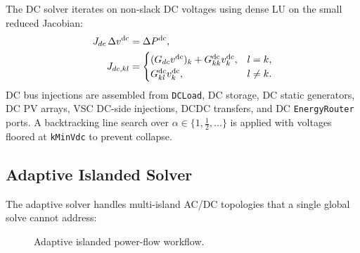 The DC solver iterates on non-slack DC voltages using dense LU on the small
reduced Jacobian:
\begin{align}
J_{dc}\,\Delta v^{\mathrm{dc}} &= \Delta P^{\mathrm{dc}}, \\
J_{dc,kl} &=
\begin{cases}
(G_{dc}v^{\mathrm{dc}})_k + G_{kk}^{\mathrm{dc}}v_k^{\mathrm{dc}}, & l=k, \\
G_{kl}^{\mathrm{dc}}v_k^{\mathrm{dc}}, & l\neq k.
\end{cases}
\end{align}
DC bus injections are assembled from \texttt{DCLoad}, DC storage, DC static
generators, DC PV arrays, VSC DC-side injections, DCDC transfers, and DC
\texttt{EnergyRouter} ports.
A backtracking line search over \(\alpha\in\{1,\tfrac12,\ldots\}\) is applied
with voltages floored at \texttt{kMinVdc} to prevent collapse.

\subsection{Adaptive Islanded Solver}

The adaptive solver handles multi-island AC/DC topologies that a single global
solve cannot address:

\begin{figure}[H]
\centering
{}
\caption{Adaptive islanded power-flow workflow.}
\label{fig:adaptive-pf}
\end{figure}


